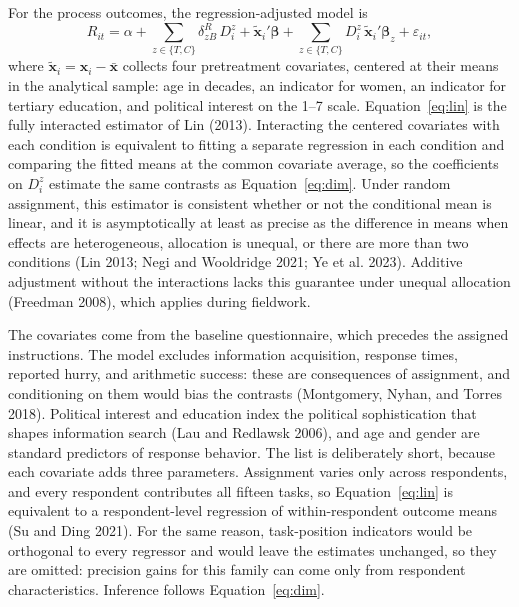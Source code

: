 \documentclass[11pt]{article}\usepackage[]{graphicx}\usepackage[]{xcolor}
\begin{document}
For the process outcomes, the regression-adjusted model is
\begin{equation}
R_{it}=\alpha+\sum_{z\in\{T,C\}}\delta^R_{zB}\,D^z_i+\tilde{\mathbf{x}}_i'\boldsymbol{\beta}+\sum_{z\in\{T,C\}}D^z_i\,\tilde{\mathbf{x}}_i'\boldsymbol{\beta}_z+\varepsilon_{it},
\label{eq:lin}
\end{equation}
where $\tilde{\mathbf{x}}_i=\mathbf{x}_i-\bar{\mathbf{x}}$ collects four pretreatment covariates, centered at their means in the analytical sample: age in decades, an indicator for women, an indicator for tertiary education, and political interest on the 1--7 scale. Equation~\eqref{eq:lin} is the fully interacted estimator of Lin (2013). Interacting the centered covariates with each condition is equivalent to fitting a separate regression in each condition and comparing the fitted means at the common covariate average, so the coefficients on $D^z_i$ estimate the same contrasts as Equation~\eqref{eq:dim}. Under random assignment, this estimator is consistent whether or not the conditional mean is linear, and it is asymptotically at least as precise as the difference in means when effects are heterogeneous, allocation is unequal, or there are more than two conditions (Lin 2013; Negi and Wooldridge 2021; Ye et al. 2023). Additive adjustment without the interactions lacks this guarantee under unequal allocation (Freedman 2008), which applies during fieldwork.

The covariates come from the baseline questionnaire, which precedes the assigned instructions. The model excludes information acquisition, response times, reported hurry, and arithmetic success: these are consequences of assignment, and conditioning on them would bias the contrasts (Montgomery, Nyhan, and Torres 2018). Political interest and education index the political sophistication that shapes information search (Lau and Redlawsk 2006), and age and gender are standard predictors of response behavior. The list is deliberately short, because each covariate adds three parameters. Assignment varies only across respondents, and every respondent contributes all fifteen tasks, so Equation~\eqref{eq:lin} is equivalent to a respondent-level regression of within-respondent outcome means (Su and Ding 2021). For the same reason, task-position indicators would be orthogonal to every regressor and would leave the estimates unchanged, so they are omitted: precision gains for this family can come only from respondent characteristics. Inference follows Equation~\eqref{eq:dim}.
\end{document}

